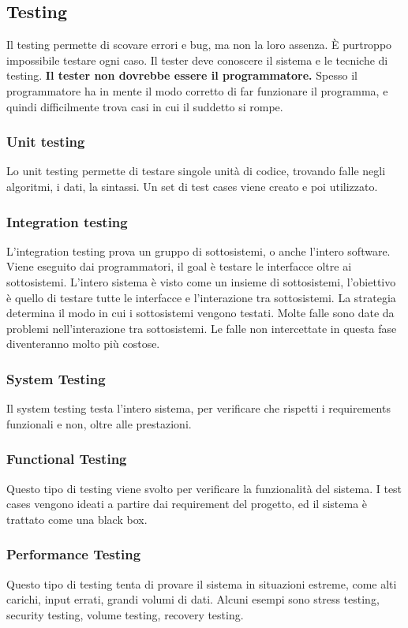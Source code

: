 \documentclass[11pt]{article}
\begin{document}
\subsection{Testing}
Il testing permette di scovare errori e bug, ma non la loro assenza. È purtroppo impossibile testare ogni caso. Il tester deve conoscere il sistema e le tecniche di testing. \textbf{Il tester non dovrebbe essere il programmatore.} Spesso il programmatore ha in mente il modo corretto di far funzionare il programma, e quindi difficilmente trova casi in cui il suddetto si rompe. 
\subsubsection{Unit testing}
Lo unit testing permette di testare singole unità di codice, trovando falle negli algoritmi, i dati, la sintassi. Un set di test cases viene creato e poi utilizzato. 
\subsubsection{Integration testing}
L'integration testing prova un gruppo di sottosistemi, o anche l'intero software. Viene eseguito dai programmatori, il goal è testare le interfacce oltre ai sottosistemi. 
L'intero sistema è visto come un insieme di sottosistemi, l'obiettivo è quello di testare tutte le interfacce e l'interazione tra sottosistemi. La strategia determina il modo in cui i sottosistemi vengono testati. Molte falle sono date da problemi nell'interazione tra sottosistemi. Le falle non intercettate in questa fase diventeranno molto più costose. 
\subsubsection{System Testing}
Il system testing testa l'intero sistema, per verificare che rispetti i requirements funzionali e non, oltre alle prestazioni. 
\subsubsection{Functional Testing}
Questo tipo di testing viene svolto per verificare la funzionalità del sistema. I test cases vengono ideati a partire dai requirement del progetto, ed il sistema è trattato come una black box. 
\subsubsection{Performance Testing}
Questo tipo di testing tenta di provare il sistema in situazioni estreme, come alti carichi, input errati, grandi volumi di dati. Alcuni esempi sono stress testing, security testing, volume testing, recovery testing.
\end{document}
